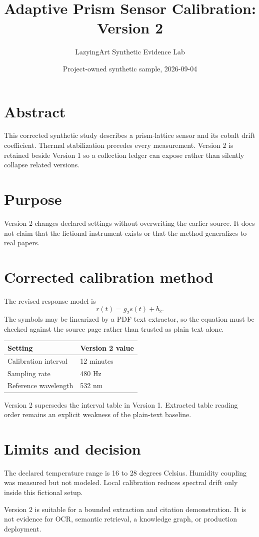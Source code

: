 \documentclass[11pt]{article}
\title{Adaptive Prism Sensor Calibration: Version 2}
\author{LazyingArt Synthetic Evidence Lab}
\date{Project-owned synthetic sample, 2026-09-04}
\begin{document}
\maketitle
\begin{center}
\end{center}

\section*{Abstract}
This corrected synthetic study describes a prism-lattice sensor and its cobalt
drift coefficient. Thermal stabilization precedes every measurement. Version 2
is retained beside Version 1 so a collection ledger can expose rather than
silently collapse related versions.

\section*{Purpose}
Version 2 changes declared settings without overwriting the earlier source. It
does not claim that the fictional instrument exists or that the method
generalizes to real papers.

\newpage
\section*{Corrected calibration method}
The revised response model is
\[
  r(t) = g_{2} s(t) + b_{2}.
\]
The symbols may be linearized by a PDF text extractor, so the equation must be
checked against the source page rather than trusted as plain text alone.

\begin{center}
\begin{tabular}{ll}
\toprule
Setting & Version 2 value \\
\midrule
Calibration interval & 12 minutes \\
Sampling rate & 480 Hz \\
Reference wavelength & 532 nm \\
\bottomrule
\end{tabular}
\end{center}

Version 2 supersedes the interval table in Version 1. Extracted table reading
order remains an explicit weakness of the plain-text baseline.

\newpage
\section*{Limits and decision}
The declared temperature range is 16 to 28 degrees Celsius. Humidity coupling
was measured but not modeled. Local calibration reduces spectral drift only
inside this fictional setup.

Version 2 is suitable for a bounded extraction and citation demonstration. It
is not evidence for OCR, semantic retrieval, a knowledge graph, or production
deployment.
\end{document}
